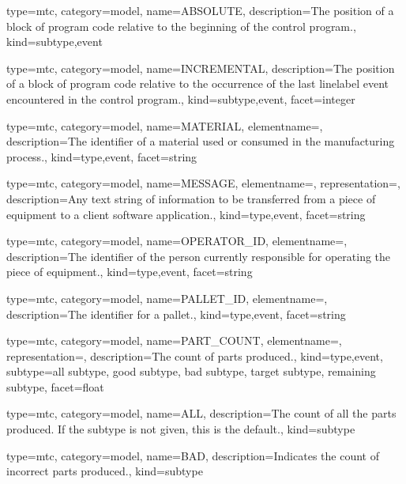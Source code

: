 {
  type=mtc,
  category=model,
  name={ABSOLUTE},
  description={The position of a block of program code relative to the beginning of the control program.},
  kind={subtype,event}
}


{
  type=mtc,
  category=model,
  name={INCREMENTAL},
  description={The position of a block of program code relative to the occurrence of the last \gls{linelabel event} encountered in the control program.},
  kind={subtype,event},
  facet={\gls{integer}}
}


{
  type=mtc,
  category=model,
  name={MATERIAL},
  elementname=,
  description={The identifier of a material used or consumed in the manufacturing process.},
  kind={type,event},
  facet={\gls{string}}
}


{
  type=mtc,
  category=model,
  name={MESSAGE},
  elementname=,
  representation=,
  description={Any text string of information to be transferred from a piece of equipment to a client software application.},
  kind={type,event},
  facet={\gls{string}}
}


{
  type=mtc,
  category=model,
  name={OPERATOR\_ID},
  elementname=,
  description={The identifier of the person currently responsible for operating the piece of equipment.},
  kind={type,event},
  facet={\gls{string}}
}


{
  type=mtc,
  category=model,
  name={PALLET\_ID},
  elementname=,
  description={The identifier for a pallet.},
  kind={type,event},
  facet={\gls{string}}
}


{
  type=mtc,
  category=model,
  name={PART\_COUNT},
  elementname=,
  representation=,
  description={The count of parts produced.},
  kind={type,event},
  subtype={\gls{all subtype}, \gls{good subtype}, \gls{bad subtype}, \gls{target subtype}, \gls{remaining subtype}},
  facet={\gls{float}}
}


{
  type=mtc,
  category=model,
  name={ALL},
  description={The count of all the parts produced.  If the subtype is not given, this is the default.},
  kind={subtype}
}


{
  type=mtc,
  category=model,
  name={BAD},
  description={Indicates the count of incorrect parts produced.},
  kind={subtype}
}


